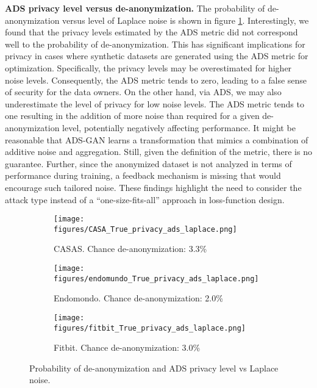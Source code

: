 \documentclass{article}
\begin{document}
\textbf{ADS privacy level versus de-anonymization.} The probability of de-anonymization versus level of Laplace noise is shown in figure \ref{fig:ADS_privacy}. Interestingly, we found that the privacy levels estimated by the ADS metric did not correspond well to the probability of de-anonymization. This has significant implications for privacy in cases where synthetic datasets are generated using the ADS metric for optimization. Specifically, the privacy levels may be overestimated for higher noise levels.
Consequently, the ADS metric tends to zero, leading to a false sense of security for the data owners. On the other hand, via ADS, we may also underestimate the level of privacy for low noise levels. The ADS metric tends to one resulting in the addition of more noise than required for a given de-anonymization level, potentially negatively affecting performance. It might be reasonable that ADS-GAN learns a transformation that mimics a combination of additive noise and aggregation. Still, given the definition of the metric, there is no guarantee. Further, since the anonymized dataset is not analyzed in terms of performance during training, a feedback mechanism is missing that would encourage such tailored noise. These findings highlight the need to consider the attack type instead of a ``one-size-fits-all'' approach in loss-function design.

\begin{figure}
     \centering
     \begin{subfigure}[b]{0.32\textwidth}
         \centering
         \texttt{[image: figures/CASA\_True\_privacy\_ads\_laplace.png]}
         \caption{CASAS. Chance de-anonymization: 3.3\%}
 
     \end{subfigure}
     \hfill
     \begin{subfigure}[b]{0.32\textwidth}
         \centering
         \texttt{[image: figures/endomundo\_True\_privacy\_ads\_laplace.png]}
         \caption{Endomondo. Chance de-anonymization: 2.0\%}
        
     \end{subfigure}
     \hfill
     \begin{subfigure}[b]{0.32\textwidth}
         \centering
         \texttt{[image: figures/fitbit\_True\_privacy\_ads\_laplace.png]}
         \caption{Fitbit. Chance de-anonymization: 3.0\%}
     \end{subfigure}
        \caption{Probability of de-anonymization and ADS privacy level vs Laplace noise.}
        \label{fig:ADS_privacy}
\end{figure}
\end{document}
